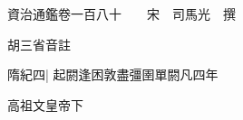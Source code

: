 






























































資治通鑑卷一百八十　　宋　司馬光　撰

胡三省音註

隋紀四|{
	起閼逢困敦盡彊圉單閼凡四年}


高祖文皇帝下

